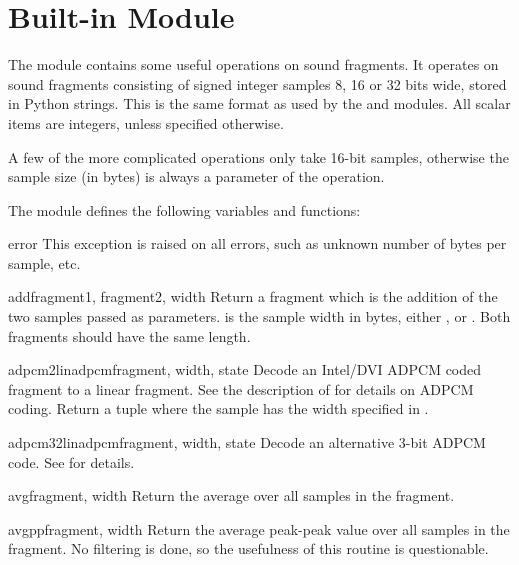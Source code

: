 \section{Built-in Module }
\label{module-audioop}

The  module contains some useful operations on sound fragments.
It operates on sound fragments consisting of signed integer samples
8, 16 or 32 bits wide, stored in Python strings.  This is the same
format as used by the  and  modules.  All
scalar items are integers, unless specified otherwise.

A few of the more complicated operations only take 16-bit samples,
otherwise the sample size (in bytes) is always a parameter of the operation.

The module defines the following variables and functions:

\begin{excdesc}{error}
This exception is raised on all errors, such as unknown number of bytes
per sample, etc.
\end{excdesc}

\begin{funcdesc}{add}{fragment1, fragment2, width}
Return a fragment which is the addition of the two samples passed as
parameters.   is the sample width in bytes, either
,  or .  Both fragments should have the same
length.
\end{funcdesc}

\begin{funcdesc}{adpcm2lin}{adpcmfragment, width, state}
Decode an Intel/DVI ADPCM coded fragment to a linear fragment.  See
the description of  for details on ADPCM coding.
Return a tuple  where the sample
has the width specified in .
\end{funcdesc}

\begin{funcdesc}{adpcm32lin}{adpcmfragment, width, state}
Decode an alternative 3-bit ADPCM code.  See  for
details.
\end{funcdesc}

\begin{funcdesc}{avg}{fragment, width}
Return the average over all samples in the fragment.
\end{funcdesc}

\begin{funcdesc}{avgpp}{fragment, width}
Return the average peak-peak value over all samples in the fragment.
No filtering is done, so the usefulness of this routine is
questionable.
\end{funcdesc}

